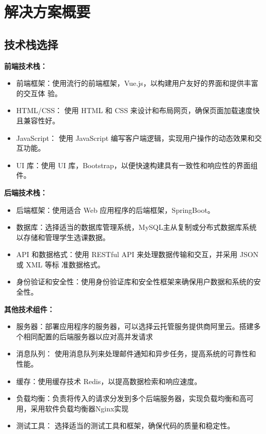 \documentclass{article}
\begin{document}
\section{解决方案概要}
\subsection{技术栈选择}
\textbf{前端技术栈：}

\begin{itemize}
  \item 前端框架：使用流行的前端框架，Vue.js，以构建用户友好的界面和提供丰富的交互体
        验。
  \item HTML/CSS： 使用 HTML 和 CSS 来设计和布局网页，确保页面加载速度快且兼容性好。
  \item JavaScript： 使用 JavaScript 编写客户端逻辑，实现用户操作的动态效果和交互功能。
  \item UI 库：使用 UI 库，Bootstrap，以便快速构建具有一致性和响应性的界面组件。
\end{itemize}

\textbf{后端技术栈：}

\begin{itemize}
  \item 后端框架：使用适合 Web 应用程序的后端框架，SpringBoot。
  \item 数据库：选择适当的数据库管理系统，MySQL主从复制或分布式数据库系统 以存储和管理学生选课数据。
  \item API 和数据格式：使用 RESTful API 来处理数据传输和交互，并采用 JSON 或 XML 等标
        准数据格式。
  \item 身份验证和安全性：使用身份验证库和安全性框架来确保用户数据和系统的安全性。
\end{itemize}

\textbf{其他技术组件：}

\begin{itemize}
  \item 服务器：部署应用程序的服务器，可以选择云托管服务提供商阿里云。搭建多个相同配置的后端服务器以应对高并发请求
  \item 消息队列： 使用消息队列来处理邮件通知和异步任务，提高系统的可靠性和性能。
  \item 缓存：使用缓存技术 Redis，以提高数据检索和响应速度。
  \item 负载均衡：负责将传入的请求分发到多个后端服务器，实现负载均衡和高可用，采用软件负载均衡器Nginx实现
  \item 测试工具： 选择适当的测试工具和框架，确保代码的质量和稳定性。
\end{itemize}
\end{document}
